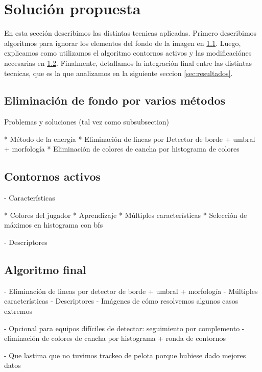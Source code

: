 \section{Solución propuesta}

En esta sección describimos las distintas tecnicas aplicadas. Primero describimos algoritmos para
ignorar los elementos del fondo de la imagen en \ref{sec:background-elimination}. Luego, explicamos
como utilizamos el algoritmo contornos activos\cite{fast-level-set} y las modificaciónes necesarias
en \ref{sec:ac}. Finalmente, detallamos la integración final entre las distintas tecnicas, que es
la que analizamos en la siguiente seccion \ref{sec:resultados}.

\subsection{Eliminación de fondo por varios métodos}
\label{sec:background-elimination}
Problemas y soluciones (tal vez como subsubsection)

  * Método de la energía
  * Eliminación de lineas por Detector de borde + umbral + morfología
  * Eliminación de colores de cancha por histograma de colores

\subsection{Contornos activos}
\label{sec:ac}

- Características

  * Colores del jugador
  * Aprendizaje
  * Múltiples características
  * Selección de máximos en histograma con bfs

- Descriptores

\subsection{Algoritmo final}
\label{sec:alg-final}

- Eliminación de lineas por detector de borde + umbral + morfología
- Múltiples características
- Descriptores
- Imágenes de cómo resolvemos algunos casos extremos

- Opcional para equipos difíciles de detectar: seguimiento por complemento
  - eliminación de colores de cancha por histograma + ronda de contornos

- Que lastima que no tuvimos trackeo de pelota porque hubiese dado mejores datos

